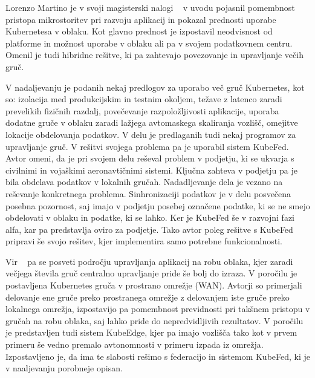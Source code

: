\documentclass[a4paper, 12pt]{book}
\begin{document}
Lorenzo Martino je v svoji magisterski nalogi ~\cite{dyn-place} v uvodu pojasnil pomembnost pristopa mikrostoritev pri razvoju aplikacij in pokazal prednosti uporabe Kubernetesa v oblaku.
Kot glavno prednost je izpostavil neodvisnost od platforme in možnost uporabe v oblaku ali pa v svojem podatkovnem centru.
Omenil je tudi hibridne rešitve, ki pa zahtevajo povezovanje in upravljanje večih gruč.

V nadaljevanju je podanih nekaj predlogov za uporabo več gruč Kubernetes, kot so: izolacija med produkcijskim in testnim okoljem, težave z latenco zaradi prevelikih fizičnih razdalj, povečevanje razpoložljivosti aplikacije, uporaba dodatne gruče v oblaku zaradi lažjega avtomaskega skaliranja vozlišč, omejitve lokacije obdelovanja podatkov.
V delu je predlaganih tudi nekaj programov za upravljanje gruč.
V rešitvi svojega problema pa je uporabil sistem KubeFed.
Avtor omeni, da je pri svojem delu reševal problem v podjetju, ki se ukvarja s civilnimi in vojaškimi aeronavtičnimi sistemi.
Ključna zahteva v podjetju pa je bila obdelava podatkov v lokalnih gručah.
Nadadljevanje dela je vezano na reševanje konkretnega problema.
Sinhronizaciji podatkov je v delu posvečena posebna pozornost, saj imajo v podjetju posebej označene podatke, ki se ne smejo obdelovati v oblaku in podatke, ki se lahko.
Ker je KubeFed še v razvojni fazi alfa, kar pa predstavlja oviro za podjetje.
Tako avtor poleg rešitve s KubeFed pripravi še svojo rešitev, kjer implementira samo potrebne funkcionalnosti.

Vir ~\cite{kube-and-edge} pa se posveti področju upravljanja aplikacij na robu oblaka, kjer zaradi večjega števila gruč centralno upravljanje pride še bolj do izraza.
V poročilu je postavljena Kubernetes gruča v prostrano omrežje (WAN).
Avtorji so primerjali delovanje ene gruče preko prostranega omrežje z delovanjem iste gruče preko lokalnega omrežja, izpostavijo pa pomembnost previdnosti pri takšnem pristopu v gručah na robu oblaka, saj lahko pride do nepredvidljivih rezultatov.
V poročilu je predstavljen tudi sistem KubeEdge, kjer pa imajo vozlišča tako kot v prvem primeru še vedno premalo avtonomnosti v primeru izpada iz omrežja.
Izpostavljeno je, da ima te slabosti rešimo s federacijo in sistemom KubeFed, ki je v naaljevanju porobneje opisan.
\end{document}
